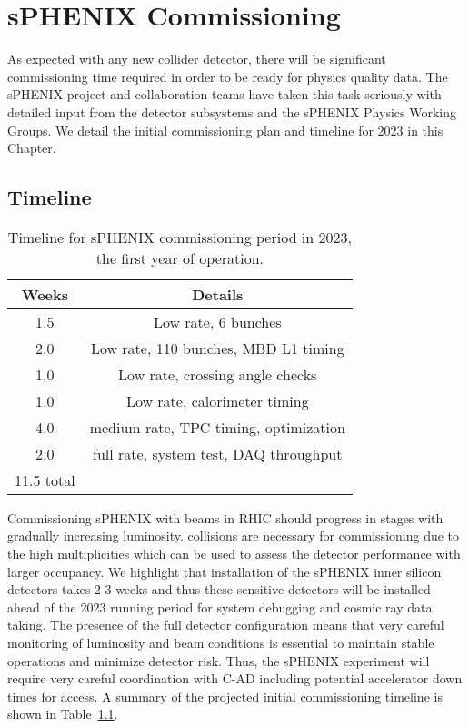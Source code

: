 \chapter{sPHENIX Commissioning}
\label{chap:commissioning}

As expected with any new collider detector, there will be significant commissioning time required in order to be ready for physics quality data.   The sPHENIX project and collaboration teams have taken this task seriously with detailed input from the detector subsystems and the sPHENIX Physics Working Groups.    We detail the initial commissioning plan and timeline for 2023 in this Chapter.

\section{Timeline}

\begin{table}[]
    \centering
    \begin{tabular}{|c|c|} \hline
        Weeks & Details \\ \hline \hline
        1.5 & Low rate, 6 bunches \\ \hline
        2.0 & Low rate, 110 bunches, MBD L1 timing \\ \hline
        1.0 & Low rate, crossing angle checks \\ \hline
        1.0 & Low rate, calorimeter timing \\ \hline
        4.0 & medium rate, TPC timing, optimization \\ \hline
        2.0 & full rate, system test, DAQ throughput \\ \hline \hline
        11.5 total & \\ \hline
    \end{tabular}
    \caption{Timeline for sPHENIX commissioning period in 2023, the first year of operation.}
    \label{tab:commision}
\end{table}

Commissioning sPHENIX with beams in RHIC should progress in stages with gradually
increasing luminosity.  \auau collisions are necessary for  commissioning due
to the high multiplicities which can be used to assess the detector performance with 
larger occupancy.   We highlight that installation of the sPHENIX inner silicon detectors takes 2-3 weeks and thus these sensitive detectors will be installed ahead of the 2023 running period for system debugging and cosmic ray data taking.   The presence of the full detector configuration means that very careful monitoring of luminosity and beam conditions is essential to maintain stable operations and minimize detector risk.   Thus, the sPHENIX experiment will require very careful coordination with C-AD including potential accelerator down times for access.    A summary of the projected initial commissioning timeline is shown in Table~\ref{tab:commision}.

